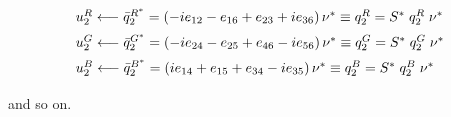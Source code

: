\documentclass[letterpaper,12pt,titlepage,oneside,final]{book}
\newcommand{\spacer}{0.2cm}
\begin{document}
\begin{equation}\begin{array}{l}\label{newantitriplet2}
u_2^R\longleftarrow \bar{q}^{R^*}_{2}=\left(-ie_{12}-e_{16}+e_{23}+ie_{36}\right)\nu^*\equiv q_2^R  = S^*\hspace{1mm}q_2^R\hspace{1mm}\nu^*  \vspace{\spacer} \\
u_2^G\longleftarrow \bar{q}^{G^*}_{2}=\left(-ie_{24}-e_{25}+e_{46}-ie_{56}\right)\nu^*\equiv q_2^G= S^*\hspace{1mm}q_2^G\hspace{1mm}\nu^* \vspace{\spacer} \\
u_2^B\longleftarrow \bar{q}^{B^*}_{2}=\left(ie_{14}+e_{15}+e_{34}-ie_{35}\right)\nu^*\equiv q_2^B= S^*\hspace{1mm}q_2^B\hspace{1mm}\nu^* \vspace{\spacer} \\
\end{array}\end{equation}
\noindent and so on.












\end{document}
